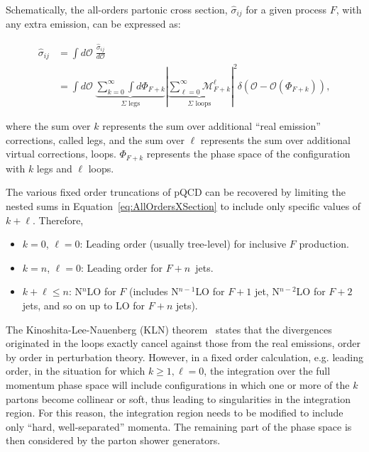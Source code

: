 Schematically, the all-orders partonic cross section, $\hat{\sigma}_{ij}$ for a given process $F$, with any extra emission, can be expressed as:

\begin{equation}
\begin{split}
\hat{\sigma}_{ij} &= \int{d\mathcal{O}\; \frac{\hat{\sigma}_{ij}}{d\mathcal{O}}} \\
                  &= \int{d\mathcal{O}} \; \underbrace{\sum_{k=0}^{\infty}{\int{d\Phi_{F+k}}}}_{\Sigma\text{ legs}}
                                          |\underbrace{\sum_{\ell=0}^{\infty}{\mathcal{M}^{\ell}_{F+k}} }_{\Sigma \text{ loops}}|^2 \delta(\mathcal{O} - \mathcal{O}(\Phi_{F+k})) ,
\end{split}
\label{eq:AllOrdersXSection}
\end{equation}

\noindent where the sum over $k$ represents the sum over additional ``real emission'' corrections, called legs, and the sum over $\ell$ represents the sum over additional virtual corrections, loops.
$\Phi_{F+k}$ represents the phase space of the configuration with $k$ legs and $\ell$ loops.

The various fixed order truncations of pQCD can be recovered by limiting the nested sums in Equation~\ref{eq:AllOrdersXSection} to include only specific values of $k+\ell$.
Therefore,

\begin{itemize}
\item $k=0$, $\ell=0$: Leading order (usually tree-level) for inclusive $F$ production.
\item $k=n$, $\ell=0$: Leading order for $F+n$~jets.
\item $k+\ell \leq n$: N$^n$LO for $F$ (includes N$^{n-1}$LO for $F+1$ jet,  N$^{n-2}$LO for $F+2$ jets, and so on up to LO for $F+n$ jets).
\end{itemize}

The Kinoshita-Lee-Nauenberg (KLN) theorem~\cite{Kinoshita:1962ur,Lee:1964is} states that the divergences originated in the loops exactly cancel against those from the real emissions, order by order in perturbation theory.
However, in a fixed order calculation, e.g. leading order, in the situation for which $k\geq1, \ell=0$, the integration over the full momentum phase space will include configurations in which one or more of the $k$ partons become collinear or soft, thus leading to singularities in the integration region.
For this reason, the integration region needs to be modified to include only ``hard, well-separated'' momenta.
The remaining part of the phase space is then considered by the parton shower generators.


